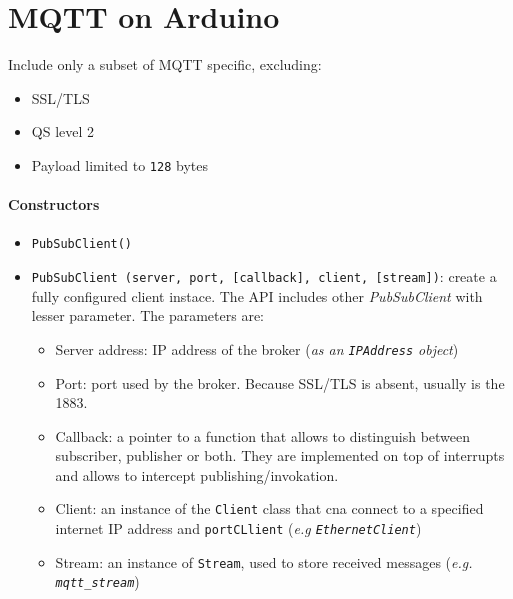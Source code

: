 \documentclass[10pt,a4paper]{report}
\theoremstyle{definition}
\begin{document}
\section{MQTT on Arduino}\label{sec:mqtt-on-arduino}
Include only a subset of MQTT specific, excluding:
\begin{itemize}
	\item 
	SSL/TLS
	\item 
	QS level 2
	\item 
	Payload limited to \texttt{128} bytes
\end{itemize}
\iffalse
\paragraph{Constructors}\label{sec:constructors}\begin{itemize}
	\item 
	\texttt{PubSubClient()}
	\item 
	\texttt{PubSubClient (server, port, [callback], client, [stream])}: create a fully configured client instace. The API includes other \textit{PubSubClient} with lesser parameter. The parameters are:
	\begin{itemize}
		\item 
		Server address: IP address of the broker (\textit{as an \texttt{IPAddress} object})
		\item 
		Port: port used by the broker. Because SSL/TLS is absent, usually is the 1883.
		\item 
		Callback: a pointer to a function that allows to distinguish between subscriber, publisher or both. They are implemented on top of interrupts and allows to intercept publishing/invokation.
		\item 
		Client: an instance of the \texttt{Client} class that cna connect to a specified internet IP address and \texttt{portCLlient} (\textit{e.g \texttt{EthernetClient}})
		\item 
		Stream: an instance of \texttt{Stream}, used to store received messages (\textit{e.g. \texttt{mqtt\_stream}})
	\end{itemize}
\end{itemize}
\end{document}

